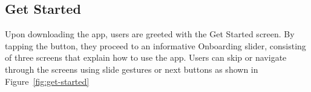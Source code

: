 \subsection{Get Started}
Upon downloading the app, users are greeted with the Get Started screen. By tapping the button, they proceed to an informative Onboarding slider, consisting of three screens that explain how to use the app. Users can skip or navigate through the screens using slide gestures or next buttons as shown in Figure~\ref{fig:get-started}
 \begin{figure}[H]
	\centering
	\hspace{5pt}

\end{figure}
